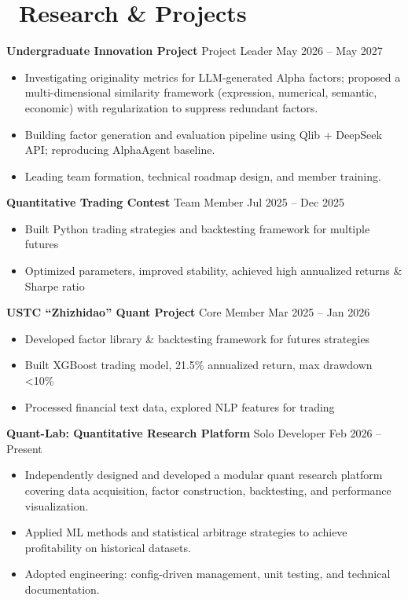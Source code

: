 \documentclass[11pt]{article}
\begin{document}
\section[Research \& Projects]{{\mdseries\makebox[\widthof{\faGraduationCap}][c]{\color{CVBlue}\faUniversity}}\ Research \& Projects}

\textbf{Undergraduate Innovation Project} \quad Project Leader \hfill May 2026 -- May 2027
\begin{itemize}
    \item Investigating originality metrics for LLM-generated Alpha factors; proposed a multi-dimensional similarity framework (expression, numerical, semantic, economic) with regularization to suppress redundant factors.
    \item Building factor generation and evaluation pipeline using Qlib + DeepSeek API; reproducing AlphaAgent baseline.
    \item Leading team formation, technical roadmap design, and member training.
\end{itemize}

\textbf{Quantitative Trading Contest} \quad Team Member \hfill Jul 2025 -- Dec 2025
\begin{itemize}
    \item Built Python trading strategies and backtesting framework for multiple futures
    \item Optimized parameters, improved stability, achieved high annualized returns \& Sharpe ratio
\end{itemize}

\textbf{USTC “Zhizhidao” Quant Project} \quad Core Member \hfill Mar 2025 -- Jan 2026
\begin{itemize}
    \item Developed factor library \& backtesting framework for futures strategies
    \item Built XGBoost trading model, 21.5\% annualized return, max drawdown <10\%
    \item Processed financial text data, explored NLP features for trading
\end{itemize}

\textbf{Quant-Lab: Quantitative Research Platform} \quad Solo Developer \hfill Feb 2026 -- Present
\begin{itemize}
    \item Independently designed and developed a modular quant research platform covering data acquisition, factor construction, backtesting, and performance visualization.
    \item Applied ML methods and statistical arbitrage strategies to achieve profitability on historical datasets.
    \item Adopted engineering: config-driven management, unit testing, and technical documentation.
\end{itemize}
\end{document}
